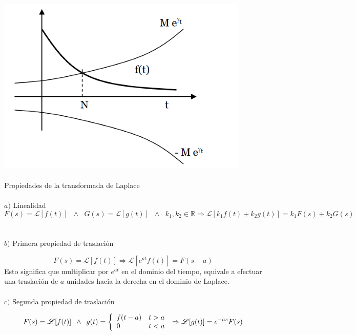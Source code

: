 \documentclass[]{article}
\begin{document}
\includegraphics{../../../Imagenes/Superior/Superior01.PNG}
\\
\\
\Large Propiedades de la transformada de Laplace
\normalsize
\\
\\
$a)$ Linealidad
$$
F(s) = \mathscr{L}[f(t)]\hspace{7pt} \wedge\hspace{7pt} G(s) = \mathscr{L}[g(t)]\hspace{7pt} \wedge\hspace{7pt} k_{1} , k_{2} \in \mathbb{R} \Rightarrow \mathscr{L}[k_{1}f(t) + k_{2}g(t)] = k_{1} F(s) + k_{2} G(s)
$$
\\
\\
$b)$ Primera propiedad de traslación

$$
F(s) = \mathscr{L}[f(t)] \Rightarrow \mathscr{L}[e^{at}f(t)] = F(s-a)
$$
Esto significa que multiplicar por $e^{at}$ en el dominio del tiempo, equivale a efectuar una traslación de $a$ unidades hacia la derecha en el dominio de Laplace.
\\
\\
$c)$ Segunda propiedad de traslación

$$
F(s) = \mathscr{L}[f(t)] \hspace{5pt} \wedge \hspace{5pt} g(t) = \left\{
	\begin{array}{ll}
		f(t-a) \hspace{10pt} t > a \\
		0 \hspace{40pt} t < a
	\end{array}
\right. \\
\Rightarrow \mathscr{L}[g(t)] = e^{-as}F(s)
$$
\end{document}

